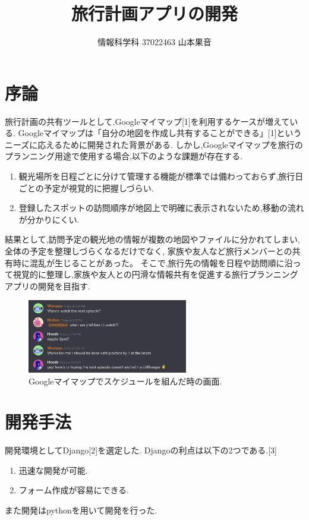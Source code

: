 \documentclass[a4j,twocolumn]{jsarticle}
\begin{document}
  \title{旅行計画アプリの開発}
  \author{情報科学科 \hspace{5mm} 37022463 \hspace{5mm} 山本果音}
  \date{}

  \maketitle


\section{序論}
\label{sec:org576a304}
旅行計画の共有ツールとして,Googleマイマップ[1]を利用するケースが増えている.
Googleマイマップは「自分の地図を作成し共有することができる」[1]というニーズに応えるために開発された背景がある.
しかし,Googleマイマップを旅行のプランニング用途で使用する場合,以下のような課題が存在する.
\begin{enumerate}
\item 観光場所を日程ごとに分けて管理する機能が標準では備わっておらず,旅行日ごとの予定が視覚的に把握しづらい.
\item 登録したスポットの訪問順序が地図上で明確に表示されないため,移動の流れが分かりにくい.
\end{enumerate}
結果として,訪問予定の観光地の情報が複数の地図やファイルに分かれてしまい, 全体の予定を整理しづらくなるだけでなく,
家族や友人など旅行メンバーとの共有時に混乱が生じることがあった。
そこで,旅行先の情報を日程や訪問順に沿って視覚的に整理し,家族や友人との円滑な情報共有を促進する旅行プランニングアプリの開発を目指す.



\begin{figure}[htbp]
\centering
\includegraphics[width=7cm]{./figs/discord.jpg}
\caption{\label{fig:org69a908b}Googleマイマップでスケジュールを組んだ時の画面.}
\end{figure}


\section{開発手法}
\label{sec:org7f0e23c}
開発環境としてDjango[2]を選定した.
Djangoの利点は以下の2つである.[3]
\begin{enumerate}
\item 迅速な開発が可能.
\item フォーム作成が容易にできる.
\end{enumerate}
また開発はpythonを用いて開発を行った.
\end{document}
